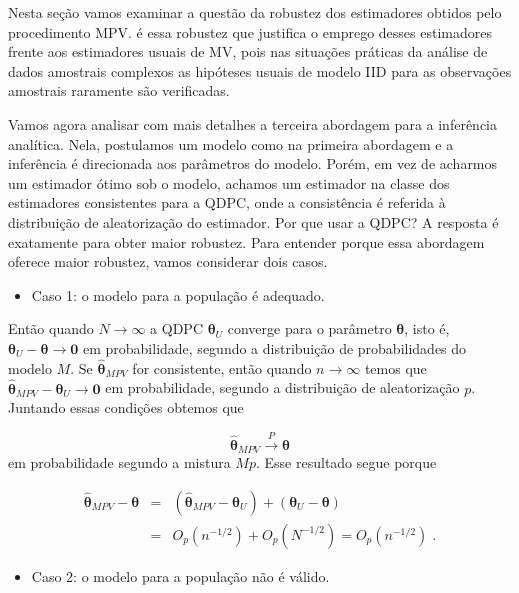 \documentclass[]{book}
\providecommand{\tightlist}{%
  \setlength{\itemsep}{0pt}\setlength{\parskip}{0pt}}
\theoremstyle{definition}
\theoremstyle{definition}
\theoremstyle{definition}
\theoremstyle{remark}
\begin{document}
Nesta seção vamos examinar a questão da robustez dos estimadores obtidos
pelo procedimento MPV. é essa robustez que justifica o emprego desses
estimadores frente aos estimadores usuais de MV, pois nas situações
práticas da análise de dados amostrais complexos as hipóteses usuais de
modelo IID para as observações amostrais raramente são verificadas.

Vamos agora analisar com mais detalhes a terceira abordagem para a
inferência analítica. Nela, postulamos um modelo como na primeira
abordagem e a inferência é direcionada aos parâmetros do modelo. Porém,
em vez de acharmos um estimador ótimo sob o modelo, achamos um estimador
na classe dos estimadores consistentes para a QDPC, onde a consistência
é referida à distribuição de aleatorização do estimador. Por que usar a
QDPC? A resposta é exatamente para obter maior robustez. Para entender
porque essa abordagem oferece maior robustez, vamos considerar dois
casos.

\begin{itemize}
\tightlist
\item
  Caso 1: o modelo para a população é adequado.
\end{itemize}

Então quando \(N\rightarrow \infty\) a QDPC \(\mathbf{\theta }_{U}\)
converge para o parâmetro \(\mathbf{\theta }\), isto é,
\(\mathbf{\theta }_{U}-\mathbf{\theta }\rightarrow \mathbf{0}\) em
probabilidade, segundo a distribuição de probabilidades do modelo \(M\).
Se \(\mathbf{\hat{\theta}}_{MPV}\) for consistente, então quando
\(n\rightarrow \infty\) temos que
\(\mathbf{\hat{\theta}}_{MPV}-\mathbf{\theta }_{U}\rightarrow\mathbf{0}\)
em probabilidade, segundo a distribuição de aleatorização \(p\).
Juntando essas condições obtemos que

\[
\mathbf{\hat{\theta}}_{MPV}\stackrel{P}{\rightarrow }\mathbf{\theta } 
\] em probabilidade segundo a mistura \(Mp\). Esse resultado segue
porque

\begin{eqnarray*}
\mathbf{\hat{\theta}}_{MPV}-\mathbf{\theta } &=&(\mathbf{\hat{\theta}}_{MPV}-
\mathbf{\theta }_{U})+\left( \mathbf{\theta }_{U}-\mathbf{\theta }\right) \\
&=&O_{p}(n^{-1/2})+O_{p}(N^{-1/2})=O_{p}(n^{-1/2})\;.
\end{eqnarray*}

\begin{itemize}
\tightlist
\item
  Caso 2: o modelo para a população não é válido.
\end{itemize}
\end{document}
